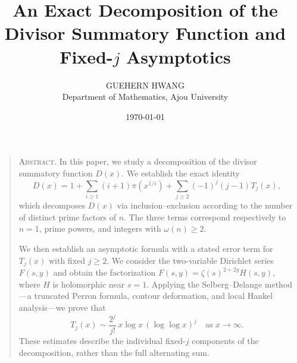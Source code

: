 \documentclass[11pt]{article}
\title{\textbf{An Exact Decomposition of the Divisor Summatory Function and Fixed-$j$ Asymptotics}}
\author{GUEHERN HWANG \\ Department of Mathematics, Ajou University}
\date{\today}
\theoremstyle{definition}
\numberwithin{equation}{section}
\begin{document}
\maketitle

\begin{quote}
\noindent
\textsc{Abstract.}
In this paper, we study a decomposition of the divisor summatory
function $D(x)$. We establish the exact identity
\begin{equation*}
    D(x) = 1 + \sum_{i \geq 1} (i+1) \pi(x^{1/i})
         + \sum_{j \geq 2} (-1)^j (j-1) T_j(x),
\end{equation*}
which decomposes $D(x)$ via inclusion--exclusion according to the number
of distinct prime factors of $n$. The three terms correspond respectively
to $n = 1$, prime powers, and integers with $\omega(n) \geq 2$.

We then establish an asymptotic formula with a stated error term for
$T_j(x)$ with fixed $j \geq 2$.
We consider the two-variable Dirichlet series $F(s, y)$ and obtain the
factorization $F(s, y) = \zeta(s)^{2+2y} H(s, y)$, where $H$ is
holomorphic near $s = 1$. Applying the Selberg--Delange
method---a truncated Perron formula, contour deformation, and local
Hankel analysis---we prove that
\begin{equation*}
    T_j(x) \sim \frac{2^j}{j!} \, x \log x \, (\log \log x)^j
    \quad \text{as } x \to \infty.
\end{equation*}
These estimates describe the individual fixed-$j$ components of the
decomposition, rather than the full alternating sum.
\end{quote}











\end{document}
